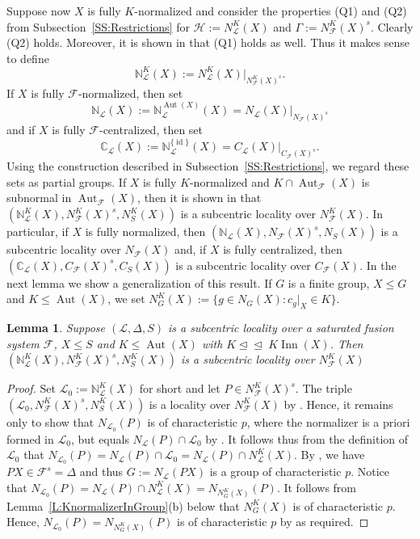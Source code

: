 \documentclass[reqno,11pt]{amsart}
\numberwithin{equation}{section}
\newtheorem{lemma}[equation]{Lemma}
\theoremstyle{definition}
\newcommand{\bN}{\mathbb{N}}
\newcommand{\bC}{\mathbb{C}}
\newcommand{\F}{\mathcal{F}}
\renewcommand{\L}{\mathcal{L}}
\renewcommand{\H}{\mathcal{H}}
\newcommand{\Aut}{\operatorname{Aut}}
\newcommand{\Inn}{\operatorname{Inn}}
\newcommand{\id}{\operatorname{id}}
\newcommand{\subn}{\unlhd\!\unlhd\;}
\begin{document}
\smallskip

Suppose now $X$ is fully $K$-normalized and consider the properties (Q1) and (Q2) from Subsection~\ref{SS:Restrictions} for $\H:=N_\L^K(X)$ and $\Gamma:=N_\F^K(X)^s$. Clearly (Q2) holds. Moreover, it is shown in \cite[Lemma~3.14]{Henke:2015} that (Q1) holds as well. Thus it makes sense to define
\[\bN_\L^K(X):=N_\L^K(X)|_{N_\F^K(X)^s}.\]
If $X$ is fully $\F$-normalized, then set 
\[\bN_\L(X):=\bN_\L^{\Aut(X)}(X)=N_\L(X)|_{N_\F(X)^s}\]
and if $X$ is fully $\F$-centralized, then set
\[\bC_\L(X):=\bN_\L^{\{\id\}}(X)=C_\L(X)|_{C_\F(X)^s}.\]
Using the construction described in Subsection~\ref{SS:Restrictions}, we regard these sets as partial groups. If $X$ is fully $K$-normalized and $K\cap\Aut_\F(X)$ is subnormal in $\Aut_\F(X)$, then it is shown in \cite[Lemma~9.13]{Henke:2015} that $(\bN_\L^K(X),N_\F^K(X)^s,N_S^K(X))$ is a subcentric locality over $N_\F^K(X)$. In particular, if $X$ is fully normalized, then $(\bN_\L(X),N_\F(X)^s,N_S(X))$ is a subcentric locality over $N_\F(X)$ and, if $X$ is fully centralized, then  $(\bC_\L(X),C_\F(X)^s,C_S(X))$ is a subcentric locality over $C_\F(X)$. In the next lemma we show a generalization of this result. If $G$ is a finite group, $X\leq G$ and $K\leq \Aut(X)$, we set $N_G^K(X):=\{g\in N_G(X)\colon c_g|_X\in K\}$.

\begin{lemma}\label{L:bNKXSubcentric}
Suppose $(\L,\Delta,S)$ is a subcentric locality over a saturated fusion system $\F$,  $X\leq S$ and $K\leq \Aut(X)$ with $K\subn K\Inn(X)$. Then $(\bN_\L^K(X),N_\F^K(X)^s,N_S^K(X))$ is a subcentric locality over $N_\F^K(X)$
\end{lemma}

\begin{proof}
Set $\L_0:=\bN_\L^K(X)$ for short and let $P\in N_\F^K(X)^s$. The triple $(\L_0,N_\F^K(X)^s,N_S^K(X))$ is a locality over $N_\F^K(X)$ by \cite[Lemma~9.13]{Henke:2015}. Hence, it remains only to show that $N_{\L_0}(P)$ is of characteristic $p$, where the normalizer is a priori formed in $\L_0$, but equals $N_\L(P)\cap \L_0$ by \cite[Lemma~9.7]{Henke:2015}. It follows thus from the definition of $\L_0$ that $N_{\L_0}(P)=N_\L(P)\cap \L_0=N_\L(P)\cap N_\L^K(X)$. By \cite[Lemma~3.14]{Henke:2015}, we have $PX\in\F^s=\Delta$ and thus $G:=N_\L(PX)$ is a group of characteristic $p$. Notice that $N_{\L_0}(P)=N_\L(P)\cap N_\L^K(X)=N_{N_G^K(X)}(P)$. It follows from Lemma~\ref{L:KnormalizerInGroup}(b) below that $N_G^K(X)$ is of characteristic $p$. Hence, $N_{\L_0}(P)=N_{N_G^K(X)}(P)$ is of characteristic $p$ by \cite[Lemma~1.2(c)]{MS:2012b} as required. 
\end{proof}
\end{document}
